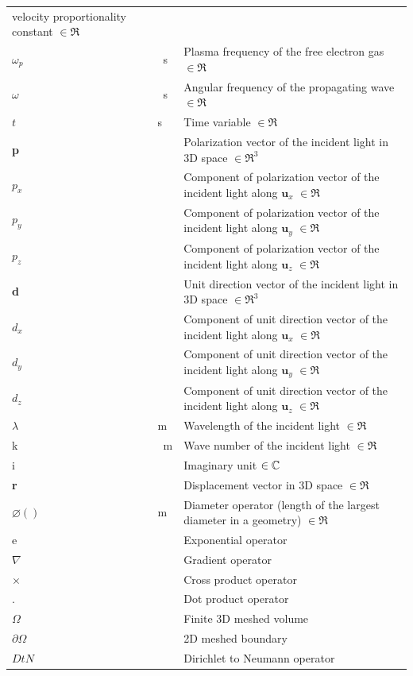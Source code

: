 \documentclass[12pt]{article}
\begin{document}
\begin{longtable*}{l l p{12cm}}
		velocity proportionality constant $\in \Re$ \\ $\omega_p$ & \si{\per \second}
		& Plasma frequency of the free electron gas $\in \Re$ \\ $\omega$ & \si{\per
			\second} & Angular frequency of the propagating wave $\in \Re$ \\ $t$ &
		\si{\second} & Time variable $\in \Re$ \\ \textbf{p} &  & Polarization vector
		of the incident light in 3D space $\in \Re^3$ \\ $p_x$ &  & Component of
		polarization vector of the incident light along $\textbf{u}_x$ $\in \Re$ \\
		$p_y$ &  & Component of polarization vector of the incident light along
		$\textbf{u}_y$ $\in \Re$ \\ $p_z$ &  & Component of polarization vector of
		the incident light along $\textbf{u}_z$ $\in \Re$ \\ \textbf{d} & & Unit
		direction vector of the incident light in 3D space $\in \Re^3$ \\ $d_x$ & &
		Component of unit direction vector of the incident light along $\textbf{u}_x$
		$\in \Re$ \\ $d_y$ & & Component of unit direction vector of the incident
		light along $\textbf{u}_y$ $\in \Re$ \\ $d_z$ & & Component of unit direction
		vector of the incident light along $\textbf{u}_z$ $\in \Re$ \\ $\lambda$ &
		\si{\meter} & Wavelength of the incident light $\in \Re$ \\ k & \si{\per
			\meter} & Wave number of the incident light $\in \Re$ \\ i & & Imaginary unit
		$\in \Bbb C$ \\ \textbf{r} &  & Displacement vector in 3D space $\in \Re$ \\
		$\varnothing()$ & \si{\meter} & Diameter operator (length of the largest
		diameter in a geometry) $\in \Re$ \\ e & & Exponential operator \\ $\nabla$ &
		& Gradient operator \\ $\times$ & & Cross product operator \\ $\textbf{.}$ & &
		Dot product operator \\ $\Omega$ & & Finite 3D meshed volume \\ $\partial
		\Omega$ & & 2D meshed boundary \\ $DtN$ & & Dirichlet to Neumann operator \\
		\bottomrule \end{longtable*}
	
\end{document}
